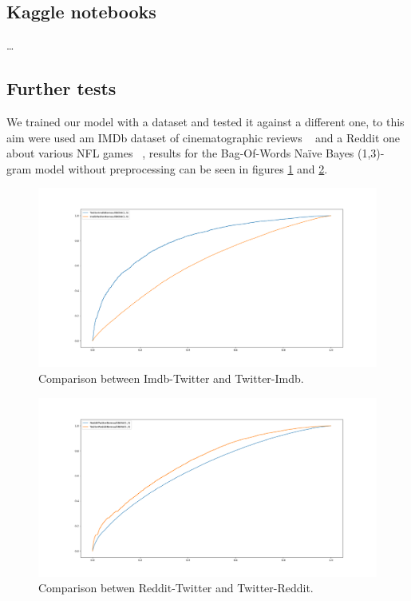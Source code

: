 \subsection*{Kaggle notebooks}

\dots

\subsection*{Further tests}
We trained our model with a dataset and tested it against a different one, to this aim were used am IMDb dataset of cinematographic reviews ~\cite{data:imdb} and a Reddit one about various NFL games ~\cite{data:reddit}, results for the Bag-Of-Words Na\"ive Bayes (1,3)-gram model without preprocessing can be seen in figures \ref{fig:TwitterImdb} and \ref{fig:TwitterReddit}.

\begin{figure}[h!t]
    \centering
    \includegraphics[scale=0.25]{../experiments/plots/ImdbTwitter}
    \caption{Comparison between Imdb-Twitter and Twitter-Imdb.}
    \label{fig:TwitterImdb}        
\end{figure}

\begin{figure}[h!t]
    \centering
    \includegraphics[scale=0.25]{../experiments/plots/RedditTwitter}
    \caption{Comparison betwen Reddit-Twitter and Twitter-Reddit.}
    \label{fig:TwitterReddit}
\end{figure}


